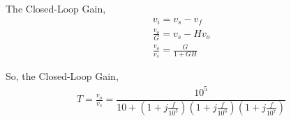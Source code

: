 \begin{enumerate}[label=\thesubsection.\arabic*.,ref=\thesubsection.\theenumi]
The Closed-Loop Gain,
\begin{align}
v_{i} = v_{s} - v_{f}\\
\frac{v_{o}}{G} = v_{s} - Hv_{o}\\
\frac{v_{o}}{v_{s}} = \frac{G}{1+GH}
\end{align}

So, the Closed-Loop Gain,
\begin{align}
T = \frac{v_{o}}{v_{s}} = \dfrac{10^5}{10 + \left(1+j\frac{f}{10^{5}}\right)\left(1+j\frac{f}{10^{6}}\right)\left(1+j\frac{f}{10^{7}}\right)}
\end{align}

\end{enumerate}
